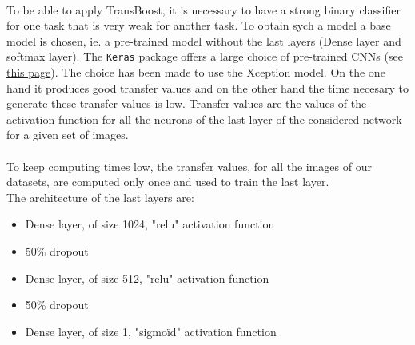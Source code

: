 \documentclass[11 pt]{article}
\begin{document}
\paragraph{}To be able to apply TransBoost, it is necessary to have a strong binary classifier for one task that is very weak for another task. To obtain sych a model a base model is chosen, ie. a pre-trained model without the last layers (Dense layer and softmax layer). The \texttt{Keras} package offers a large choice of pre-trained CNNs (see \href{https://keras.io/applications/}{this page}). The choice has been made to use the Xception model. On the one hand it produces good transfer values and on the other hand the time necesary to generate these transfer values is low. Transfer values are the values of the activation function for all the neurons of the last layer of the considered network for a given set of images. 

\paragraph{}To keep computing times low, the transfer values, for all the images of our datasets, are computed only once and used to train the last layer.\\ 

The architecture of the last layers are:
\medskip
\begin{samepage}
  \begin{itemize}
    \item Dense layer, of size 1024, "relu" activation function
    \nopagebreak
    \item 50\% dropout 
    \nopagebreak
    \item Dense layer, of size 512, "relu" activation function
    \nopagebreak
    \item 50\% dropout 
    \nopagebreak
    \item Dense layer, of size 1, "sigmoïd" activation function
  \end{itemize}
\end{samepage}
\end{document}
